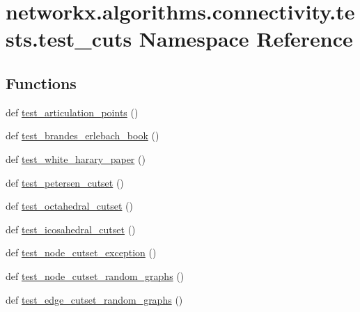 \hypertarget{namespacenetworkx_1_1algorithms_1_1connectivity_1_1tests_1_1test__cuts}{}\section{networkx.\+algorithms.\+connectivity.\+tests.\+test\+\_\+cuts Namespace Reference}
\label{namespacenetworkx_1_1algorithms_1_1connectivity_1_1tests_1_1test__cuts}
\subsection*{Functions}
\begin{DoxyCompactItemize}
\item 
def \hyperlink{namespacenetworkx_1_1algorithms_1_1connectivity_1_1tests_1_1test__cuts_a9ba50b8eac6eac5a62511e4cfe2207f8}{test\+\_\+articulation\+\_\+points} ()
\item 
def \hyperlink{namespacenetworkx_1_1algorithms_1_1connectivity_1_1tests_1_1test__cuts_a99f5bb146c0602898c9ab4f870af5e99}{test\+\_\+brandes\+\_\+erlebach\+\_\+book} ()
\item 
def \hyperlink{namespacenetworkx_1_1algorithms_1_1connectivity_1_1tests_1_1test__cuts_acffd9fd7e1284a49f849de8d936ae7d9}{test\+\_\+white\+\_\+harary\+\_\+paper} ()
\item 
def \hyperlink{namespacenetworkx_1_1algorithms_1_1connectivity_1_1tests_1_1test__cuts_a1e411d21221156f7c2e987550bfb28ca}{test\+\_\+petersen\+\_\+cutset} ()
\item 
def \hyperlink{namespacenetworkx_1_1algorithms_1_1connectivity_1_1tests_1_1test__cuts_abb7284f8a5fb5f5b675f14c521c985bf}{test\+\_\+octahedral\+\_\+cutset} ()
\item 
def \hyperlink{namespacenetworkx_1_1algorithms_1_1connectivity_1_1tests_1_1test__cuts_a9ebc73e4588d6d4a768efed66b213fb3}{test\+\_\+icosahedral\+\_\+cutset} ()
\item 
def \hyperlink{namespacenetworkx_1_1algorithms_1_1connectivity_1_1tests_1_1test__cuts_a87c7fc489bd62c92d8d20fbcd85e86d1}{test\+\_\+node\+\_\+cutset\+\_\+exception} ()
\item 
def \hyperlink{namespacenetworkx_1_1algorithms_1_1connectivity_1_1tests_1_1test__cuts_a1034ae14b058c1c20bc8497f3c2264c1}{test\+\_\+node\+\_\+cutset\+\_\+random\+\_\+graphs} ()
\item 
def \hyperlink{namespacenetworkx_1_1algorithms_1_1connectivity_1_1tests_1_1test__cuts_aee9aafc5ef9c90d7f9543477b6b50492}{test\+\_\+edge\+\_\+cutset\+\_\+random\+\_\+graphs} ()

\end{DoxyCompactItemize}

